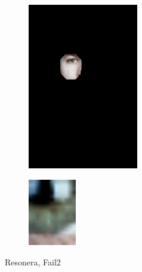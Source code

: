 \begin{figure}[H]
\begin{subfigure}{.25\textwidth}
  \centering
  \includegraphics[width=0.53\textwidth]{img/fd3/fail2_faceImage.png}
  \caption{}
\end{subfigure}%
\begin{subfigure}{.25\textwidth}
  \centering
  \includegraphics[width=0.23\textwidth]{img/fd3/fail2_output.png}
  \caption{}
\end{subfigure}%

\caption{Resonera, Fail2}
\label{fig:fail2}
\end{figure}




